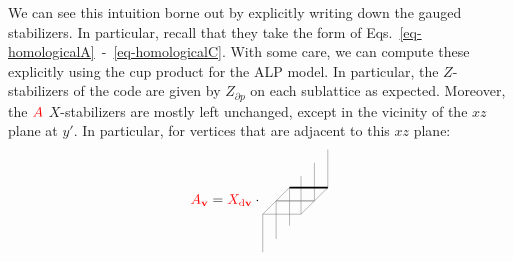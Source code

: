 \documentclass[aps,prx,reprint,superscriptaddress,nofootinbib]{revtex4-2}
\theoremstyle{definition}
\newcommand{\AR}[1]{\textcolor{red}{#1}}
\newcommand{\exd}{\text{d}}
\newcommand{\<}{\langle}
\renewcommand{\>}{\rangle}
\begin{document}
We can see this intuition borne out by explicitly writing down the gauged stabilizers.
%
In particular, recall that they take the form of Eqs.~\eqref{eq-homologicalA}~-~\eqref{eq-homologicalC}.
%
With some care, we can compute these explicitly using the cup product for the ALP model.
%
In particular, the $Z$-stabilizers of the code are given by $Z_{\partial p}$ on each sublattice as expected.
%
Moreover, the $\AR{A}$ $X$-stabilizers are mostly left unchanged, except in the vicinity of the $xz$ plane at $y'$.
%
In particular, for vertices that are adjacent to this $xz$ plane:
\begin{equation}
    \textcolor{red}{A_{\mathbf{v}}} = \textcolor{red}{X_{\exd \mathbf{v}}} \cdot 
    \begin{tikzpicture}[scale = 0.48, baseline={([yshift=-.5ex]current bounding box.center)}]
    \coordinate (A) at (0, 0);
    \coordinate (Azp) at (0, 2);%
    \coordinate (Azm) at (0, -2); %
    \coordinate (B) at (0.7, 0.7);
    \coordinate (Bzm) at (0.7, 0.7 -2);
    \coordinate (Bzp) at (0.7, 0.7 + 2);
    \coordinate (C) at (2.7, 0.7);
    \coordinate (Czm) at (2.7, 0.7 -2);
    \coordinate (Czp) at (2.7, 2.7);
    \coordinate (D) at (2, 0);
    \coordinate (Dzm) at (2, -2);
    \coordinate (Dzp) at (2, 2);
    \coordinate (E) at (-0.7, -0.7);
    \coordinate (Ezp) at (-0.7, -0.7 + 2);
    \coordinate (Ezm) at (-0.7, -0.7 - 2);
    \coordinate (F) at (-2.7, -0.7);
    \coordinate (Fzm) at (-2.7, -0.7-2);
    \coordinate (Fzp) at (-2.7, -0.7+2);
    \coordinate (G) at (-2, 0);
    \coordinate (Gzm) at (-2, -2);
    \coordinate (Gzp) at (-2, +2);
    \coordinate (H) at (-1.3, 0.7);
    \coordinate (Hzm) at (-1.3, 0.7 - 2);
    \coordinate (Hzp) at (-1.3, 0.7 + 2);
    \coordinate (I) at (1.3, -0.7);
    \coordinate (Izm) at (1.3, -0.7 -2);
    \coordinate (Izp) at (1.3, -0.7 + 2);
    \draw[color = gray] (A) -- (B) -- (C) -- (D)--cycle;
    \draw[color = gray] (A) -- (E) -- (I) -- (D)--cycle; 
    \draw[color = gray] (Azm) -- (A);   
    \draw[color = gray] (Bzm) -- (B);
    \draw[color = gray] (C) -- (Czp);
    \draw[color = gray] (D) -- (Dzp);
    \draw[color = gray] (Ezm) -- (E);
    \draw[color = gray] (I) -- (Izp);
    \draw[color = black, line width = 1.25 pt] (B) -- (C);

\end{tikzpicture}
\end{equation}
\end{document}
